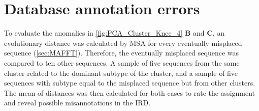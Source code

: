 \section{Database annotation errors} \label{sec:Clustering_Anomalies}

To evaluate the anomalies in \autoref{fig:PCA_Cluster_Knee_4} \textbf{\textsf{B}} and \textbf{\textsf{C}}, an evolutionary distance was calculated by \gls{MSA} for every eventually misplaced sequence (\autoref{sec:MAFFT}). Therefore, the eventually misplaced sequence was compared to ten other sequences. A sample of five sequences from the same cluster related to the dominant subtype of the cluster, and a sample of five sequences with subtype equal to the misplaced sequence but from other clusters. The mean of distances was then calculated for both cases to rate the assignment and reveal possible misannotations in the \gls{IRD}. 

\begin{table}[!hbt]
    \centering
    \caption[Anomalies in segment 4 cluster 2 with PK]{\textbf{Anomalies in segment 4 cluster 2 with PK.} The \glspl{MSA} mean distance of the given sequences in comparison to a sample of H1 sequences of the same cluster and a sample of H10 sequences present in other clusters.}
    \label{tab:PCA_Error_4_2}
\end{table}

\vspace{1em}

